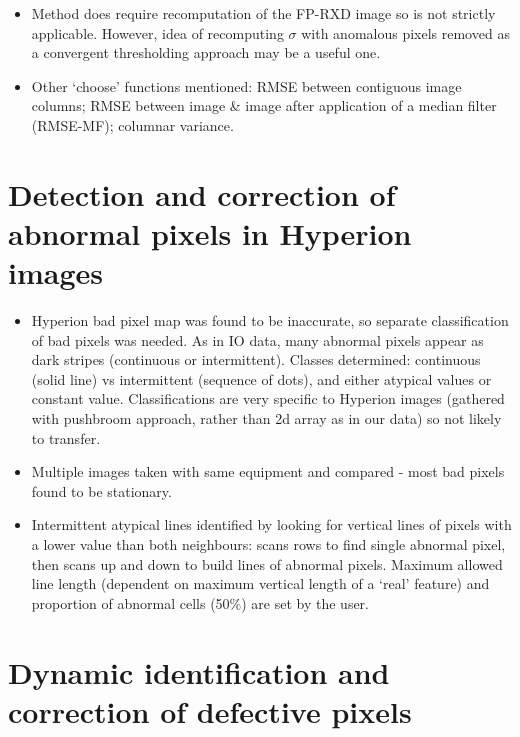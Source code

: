 \documentclass[10pt,fleqn]{article}
\begin{document}
\begin{itemize}
\begin{itemize}
\item
Method does require recomputation of the FP-RXD image so is not strictly applicable. However, idea of recomputing $\sigma$ with anomalous pixels removed as a convergent thresholding approach may be a useful one.

\item
Other `choose' functions mentioned: RMSE between contiguous image columns; RMSE between image \& image after application of a median filter (RMSE-MF); columnar variance.
\end{itemize}

\end{itemize}

\section{Detection and correction of abnormal pixels in Hyperion images \cite{Han2002}}

\begin{itemize}
\item
Hyperion bad pixel map was found to be inaccurate, so separate classification of bad pixels was needed. As in IO data, many abnormal pixels appear as dark stripes (continuous or intermittent). Classes determined: continuous (solid line) vs intermittent (sequence of dots), and either atypical values or constant value. Classifications are very specific to Hyperion images (gathered with pushbroom approach, rather than 2d array as in our data) so not likely to transfer.

\item
Multiple images taken with same equipment and compared - most bad pixels found to be stationary.

\item 
Intermittent atypical lines identified by looking for vertical lines of pixels with a lower value than both neighbours: scans rows to find single abnormal pixel, then scans up and down to build lines of abnormal pixels. Maximum allowed line length (dependent on maximum vertical length of a `real' feature) and proportion of abnormal cells (50\%) are set by the user.
\end{itemize}

\section{Dynamic identification and correction of defective pixels \cite{Pinto2012}}
\label{Pinto2012}
\end{document}
